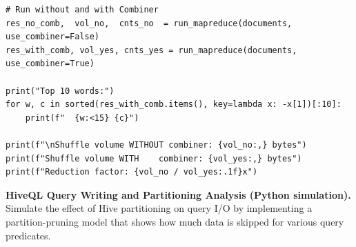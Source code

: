 \begin{lstlisting}[style=pyspark, caption={PE4.1: MapReduce word count with Combiner}]
# Run without and with Combiner
res_no_comb,  vol_no,  cnts_no  = run_mapreduce(documents, use_combiner=False)
res_with_comb, vol_yes, cnts_yes = run_mapreduce(documents, use_combiner=True)

print("Top 10 words:")
for w, c in sorted(res_with_comb.items(), key=lambda x: -x[1])[:10]:
    print(f"  {w:<15} {c}")

print(f"\nShuffle volume WITHOUT combiner: {vol_no:,} bytes")
print(f"Shuffle volume WITH    combiner: {vol_yes:,} bytes")
print(f"Reduction factor: {vol_no / vol_yes:.1f}x")
\end{lstlisting}

\pe \textbf{HiveQL Query Writing and Partitioning Analysis (Python simulation).}
Simulate the effect of Hive partitioning on query I/O by implementing
a partition-pruning model that shows how much data is skipped for
various query predicates.

